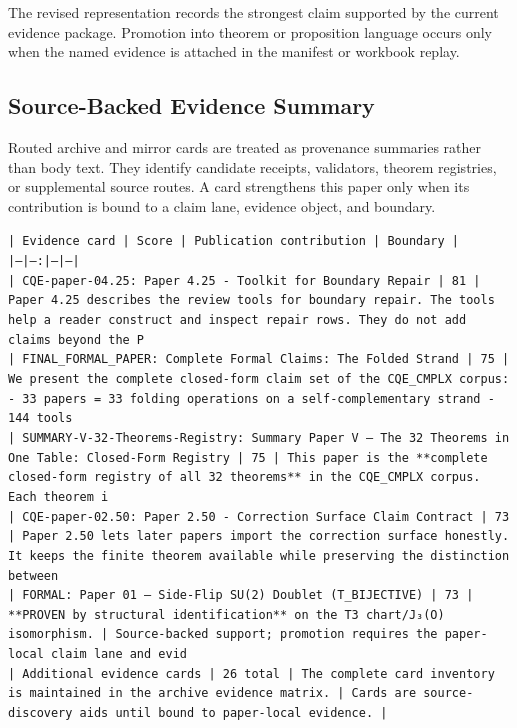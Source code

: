 \documentclass[11pt]{article}
\begin{document}
The revised representation records the strongest claim supported by the current evidence package. Promotion into theorem or proposition language occurs only when the named evidence is attached in the manifest or workbook replay.

\subsection*{Source-Backed Evidence Summary}

Routed archive and mirror cards are treated as provenance summaries rather than
body text. They identify candidate receipts, validators, theorem registries, or
supplemental source routes. A card strengthens this paper only when its
contribution is bound to a claim lane, evidence object, and boundary.

\noindent\texttt{| Evidence card | Score | Publication contribution | Boundary |}\\
\noindent\texttt{|---|---:|---|---|}\\
\noindent\texttt{| CQE-paper-04.25: Paper 4.25 - Toolkit for Boundary Repair | 81 | Paper 4.25 describes the review tools for boundary repair. The tools help a reader construct and inspect repair rows. They do not add claims beyond the P}\\
\noindent\texttt{| FINAL\_FORMAL\_PAPER: Complete Formal Claims: The Folded Strand | 75 | We present the complete closed-form claim set of the CQE\_CMPLX corpus: - 33 papers = 33 folding operations on a self-complementary strand - 144 tools}\\
\noindent\texttt{| SUMMARY-V-32-Theorems-Registry: Summary Paper V — The 32 Theorems in One Table: Closed-Form Registry | 75 | This paper is the **complete closed-form registry of all 32 theorems** in the CQE\_CMPLX corpus. Each theorem i}\\
\noindent\texttt{| CQE-paper-02.50: Paper 2.50 - Correction Surface Claim Contract | 73 | Paper 2.50 lets later papers import the correction surface honestly. It keeps the finite theorem available while preserving the distinction between}\\
\noindent\texttt{| FORMAL: Paper 01 — Side-Flip SU(2) Doublet (T\_BIJECTIVE) | 73 | **PROVEN by structural identification** on the T3 chart/J₃(O) isomorphism. | Source-backed support; promotion requires the paper-local claim lane and evid}\\
\noindent\texttt{| Additional evidence cards | 26 total | The complete card inventory is maintained in the archive evidence matrix. | Cards are source-discovery aids until bound to paper-local evidence. |}\\
\end{document}
